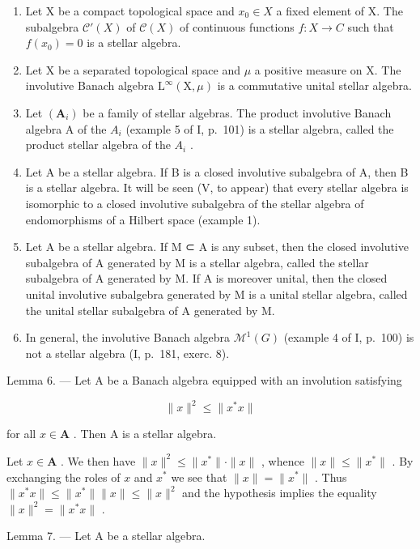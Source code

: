 \begin{enumerate}
\def\labelenumi{\arabic{enumi})}
\setcounter{enumi}{2}
\item
  Let X be a compact topological space and \(x_{0} \in X\) a fixed element of X. The subalgebra \(\mathcal{C}'(X)\) of \(\mathcal{C}(X)\) of continuous functions \(f: X \to C\) such that \(f(x_{0}) = 0\) is a stellar algebra.
\item
  Let X be a separated topological space and \(\mu\) a positive measure on X. The involutive Banach algebra \(\mathrm{L}^{\infty}(\mathrm{X},\mu)\) is a commutative unital stellar algebra.
\item
  Let \((\mathbf{A}_{i})\) be a family of stellar algebras. The product involutive Banach algebra A of the \(A_{i}\) (example 5 of I, p.~101) is a stellar algebra, called the product stellar algebra of the \(A_{i}\) .
\item
  Let A be a stellar algebra. If B is a closed involutive subalgebra of A, then B is a stellar algebra. It will be seen (V, to appear) that every stellar algebra is isomorphic to a closed involutive subalgebra of the stellar algebra of endomorphisms of a Hilbert space (example 1).
\item
  Let A be a stellar algebra. If M ⊂ A is any subset, then the closed involutive subalgebra of A generated by M is a stellar algebra, called the stellar subalgebra of A generated by M. If A is moreover unital, then the closed unital involutive subalgebra generated by M is a unital stellar algebra, called the unital stellar subalgebra of A generated by M.
\item
  In general, the involutive Banach algebra \(\mathcal{M}^{1}(G)\) (example 4 of I, p.~100) is not a stellar algebra (I, p.~181, exerc. 8).
\end{enumerate}

Lemma 6. --- Let A be a Banach algebra equipped with an involution satisfying

\[
\| x \| ^ {2} \leqslant \| x ^ {*} x \|\tag{1}
\]

for all \(x \in \mathbf{A}\) . Then A is a stellar algebra.

Let \(x \in \mathbf{A}\) . We then have \(\|x\|^2 \leqslant \|x^*\| \cdot \|x\|\) , whence \(\|x\| \leqslant \|x^*\|\) . By exchanging the roles of \(x\) and \(x^*\) we see that \(\|x\| = \|x^*\|\) . Thus \(\|x^*x\| \leqslant \|x^*\|\|x\| \leqslant \|x\|^2\) and the hypothesis implies the equality \(\|x\|^2 = \|x^*x\|\) .

Lemma 7. --- Let A be a stellar algebra.

